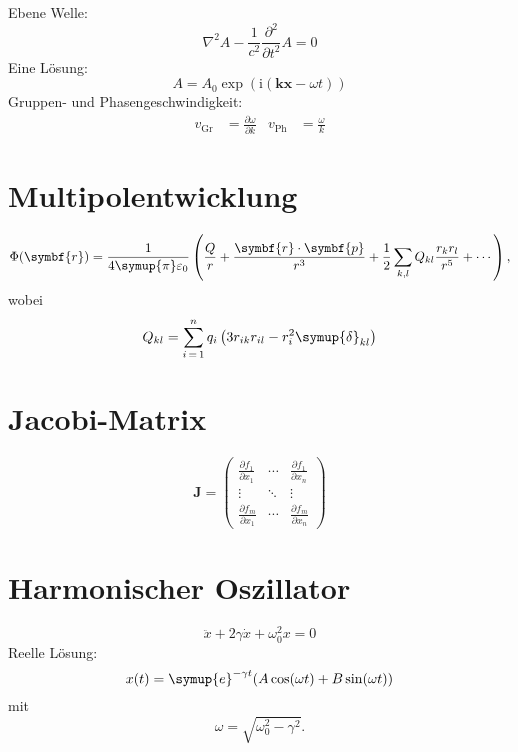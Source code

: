 \documentclass{scrartcl}
\begin{document}
Ebene Welle:
\begin{equation}
  \nabla^2 A - \frac{1}{c^2} \frac{\partial^2}{\partial t^2} A = 0
\end{equation}
Eine Lösung:
\begin{equation}
  A = A_0 \exp(\mathrm{i} (\symbf{k} \symbf{x} - \omega t))
\end{equation}
Gruppen- und Phasengeschwindigkeit:
\begin{align}
  v_\text{Gr} &= \frac{\partial \omega}{\partial k} &
  v_\text{Ph} &= \frac{\omega}{k}
\end{align}

\section{Multipolentwicklung}

\begin{equation}
  \Phi(\symbf{r}) = \frac{1}{4 \symup{\pi} \varepsilon_0} \left(
    \frac{Q}{r} + \frac{\symbf{r} \cdot \symbf{p}}{r^3}
    + \frac{1}{2} \sum_{k, l} Q_{k l} \frac{r_k r_l}{r^5} + \dotsb
  \right) ,
\end{equation}
wobei
\begin{equation*}
  Q_{k l} = \sum_{i\,=\,1}^n q_i \left( 3 r_{i k} r_{i l} - r_i^2 \symup{\delta}_{k l} \right)
\end{equation*}

\section{Jacobi-Matrix}

\begin{equation}
  \symbf{J} =
  \begin{pmatrix}
    \frac{\partial f_1}{\partial x_1} & \cdots  & \frac{\partial f_1}{\partial x_n} \\
    \vdots                            & \ddots  & \vdots                            \\
    \frac{\partial f_m}{\partial x_1} & \cdots  & \frac{\partial f_m}{\partial x_n}
  \end{pmatrix}
\end{equation}

\section{Harmonischer Oszillator}

\begin{equation}
  \ddot{x} + 2 \gamma \dot{x} + \omega_0^2 x = 0
\end{equation}
Reelle Lösung:
\begin{equation}
  x(t) = \symup{e}^{-\gamma t} (A \cos(\omega t) + B \sin(\omega t))
\end{equation}
mit
\begin{equation}
  \omega = \sqrt{\omega_0^2 - \gamma^2} .
\end{equation}
\end{document}
